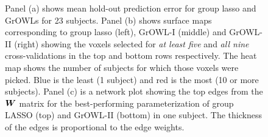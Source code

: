 
\begin{figure}[!h]
\centering
{}
\hfil
{}
\hfill
{}
\caption{Panel (a) shows mean hold-out prediction error for group lasso and
  GrOWLs for 23 subjects. Panel (b) shows surface maps corresponding to group
  lasso (left), GrOWL-I (middle) and GrOWL-II (right) showing the voxels
  selected for \textit{at least five} and \textit{all nine} cross-validations in
  the top and bottom rows respectively. The heat map shows the number of
  subjects for which those voxels were picked. Blue is the least (1 subject) and
  red is the most (10 or more subjects). Panel (c) is a network plot showing the
  top edges from the $\boldsymbol{W}$ matrix for the best-performing parameterization of
  group LASSO (top) and GrOWL-II (bottom) in one subject. The thickness of the
  edges is proportional to the edge weights.}
\label{fig.error}
\end{figure}


